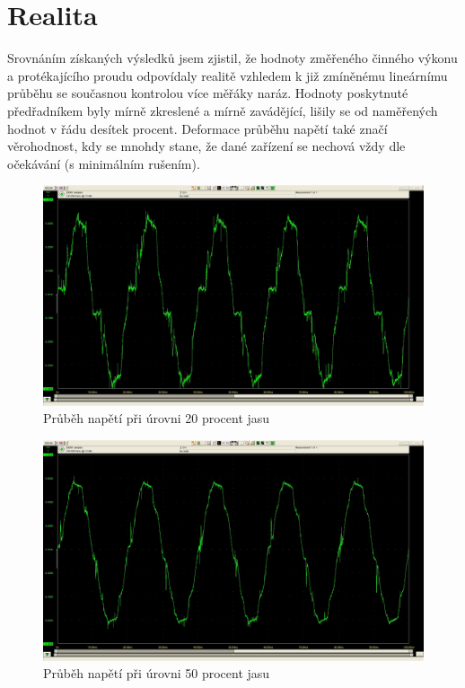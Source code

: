 \documentclass[FM,RP]{tulthesis}
\begin{document}
  \section{Realita} 
   Srovnáním získaných výsledků jsem zjistil, že hodnoty změřeného činného výkonu a protékajícího proudu odpovídaly realitě vzhledem k již zmíněnému lineárnímu průběhu se současnou kontrolou více měřáky naráz. Hodnoty poskytnuté předřadníkem byly mírně zkreslené a mírně zavádějící, lišily se od naměřených hodnot v řádu desítek procent. Deformace průběhu napětí také značí věrohodnost, kdy se mnohdy stane, že dané zařízení se nechová vždy dle očekávání (s minimálním rušením).   
  \vspace{2em}
     \begin{figure}[h]
  	\begin{center}
  		\includegraphics[scale=0.29]{ballast20procent.jpg}
  		\caption{Průběh napětí při úrovni 20 procent jasu} 
  		\label{bal10}
  	\end{center}
  \end{figure}
  
  \begin{figure}[h]
  	\begin{center}
  		\includegraphics[scale=0.29]{ballast50procent.jpg}
  		\caption{Průběh napětí při úrovni 50 procent jasu} 
  		\label{bal50}
  	\end{center}
  \end{figure}
  
\end{document}
